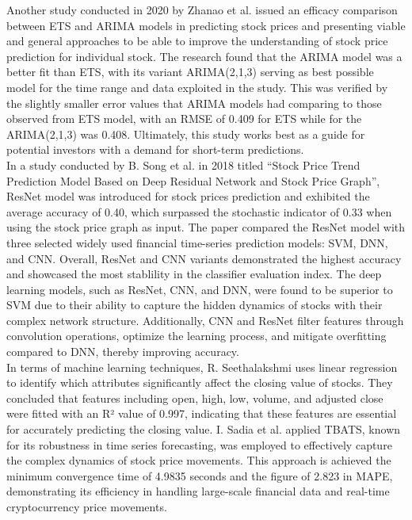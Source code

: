 \documentclass[conference]{IEEEtran}
\begin{document}
Another study conducted in 2020 by Zhanao et al. \cite{b6} issued an efficacy comparison between ETS and ARIMA models in predicting stock prices and presenting viable and general approaches to be able to improve the understanding of stock price prediction for individual stock. The research found that the ARIMA model was a better fit than ETS, with its variant ARIMA(2,1,3) serving as best possible model for the time range and data exploited in the study. This was verified by the slightly smaller error values that ARIMA models had comparing to those observed from ETS model, with an RMSE of 0.409 for ETS while for the ARIMA(2,1,3) was 0.408. Ultimately, this study works best as a guide for potential investors with a demand for short-term predictions. \\

In a study conducted by B. Song et al. \cite{b7} in 2018 titled “Stock Price Trend Prediction Model Based on Deep Residual Network and Stock Price Graph”, ResNet model was introduced for stock prices prediction and exhibited the average accuracy of 0.40, which surpassed the stochastic indicator of 0.33 when using the stock price graph as input. The paper compared the ResNet model with three selected widely used financial time-series prediction models: SVM, DNN, and CNN. Overall, ResNet and CNN variants demonstrated the highest accuracy and showcased the most stablility in the classifier evaluation index. The deep learning models, such as ResNet, CNN, and DNN, were found to be superior to SVM due to their ability to capture the hidden dynamics of stocks with their complex network structure. Additionally, CNN and ResNet filter features through convolution operations, optimize the learning process, and mitigate overfitting compared to DNN, thereby improving accuracy. \\

In terms of machine learning techniques, R. Seethalakshmi \cite{b8} uses linear regression to identify which attributes significantly affect the closing value of stocks. They concluded that features including open, high, low, volume, and adjusted close were fitted with an R² value of 0.997, indicating that these features are essential for accurately predicting the closing value. I. Sadia et al. \cite{b9} applied TBATS, known for its robustness in time series forecasting, was employed to effectively capture the complex dynamics of stock price movements. This approach is achieved the minimum convergence time of 4.9835 seconds and the figure of 2.823 in MAPE, demonstrating its efficiency in handling large-scale financial data and real-time cryptocurrency price movements. 
\end{document}
